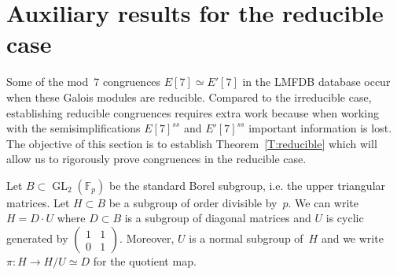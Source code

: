 \documentclass[12pt, reqno]{amsart}
\newcommand{\F}{\mathbb{F}}
\newcommand{\GL}{\operatorname{GL}}
\def\r3{\sqrt{-3}}
\numberwithin{equation}{section}
\theoremstyle{definition}
\theoremstyle{remark}
\newtheorem{remark}[theorem]{Remark}
\begin{document}

\section{Auxiliary results for the reducible case}

Some of the mod~$7$ congruences 
$E[7] \simeq E'[7]$ in the LMFDB database occur 
when these Galois modules are reducible. Compared to the irreducible case, establishing reducible congruences requires extra work because when working with the semisimplifications $E[7]^{ss}$ and $E'[7]^{ss}$ important information is lost.
The objective of this section is to establish Theorem~\ref{T:reducible} which will allow us to rigorously prove congruences in the reducible case.


Let $B \subset \GL_2(\F_p)$ be the standard Borel subgroup, i.e. the
upper triangular matrices. Let $H \subset B$ be a subgroup of order
divisible by~$p$.  We can write~$H = D\cdot U$ where $D \subset B$ is
a subgroup of diagonal matrices and $U$ is cyclic generated by
$\left(\begin{smallmatrix} 1 & 1 \\ 0 & 1
                            \end{smallmatrix} \right)$.   
Moreover, $U$ is a normal subgroup of~$H$ 
and we write $\pi : H \to H/U \simeq D$ for the quotient map.
\end{document}
